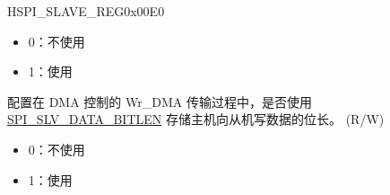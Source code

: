 \begin{register}{H}{SPI\_SLAVE\_REG}{0x00E0}
\begin{regdesc}
\begin{reglist}
\begin{itemize}
    \item 0：不使用
    \item 1：使用
\end{itemize}
\label{fielddesc:SPISLVWRDMABITLENEN}\item [SPI\_SLV\_WRDMA\_BITLEN\_EN] 配置在 DMA 控制的 Wr\_DMA 传输过程中，是否使用 \hyperref[fielddesc:SPISLVDATABITLEN]{SPI\_SLV\_DATA\_BITLEN} 存储主机向从机写数据的位长。 (R/W)\\
\begin{itemize}
    \item 0：不使用
    \item 1：使用
\end{itemize}
\item [见下页]
\end{reglist}\end{regdesc}
\end{register}

